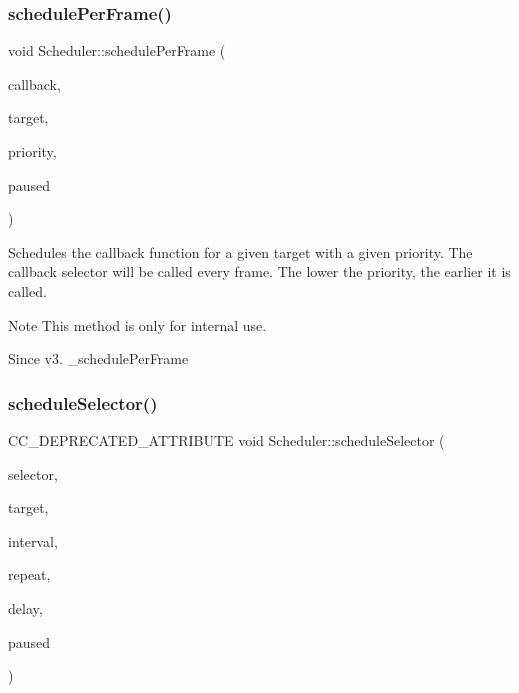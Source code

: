 \subsubsection{\texorpdfstring{schedule\+Per\+Frame()}{schedulePerFrame()}\hspace{0.1cm}{\footnotesize\ttfamily [2/2]}}
{\footnotesize\ttfamily void Scheduler\+::schedule\+Per\+Frame (\begin{DoxyParamCaption}\item[{const cc\+Scheduler\+Func \&}]{callback,  }\item[{void $\ast$}]{target,  }\item[{int}]{priority,  }\item[{bool}]{paused }\end{DoxyParamCaption})\hspace{0.3cm}{\ttfamily [protected]}}

Schedules the \textquotesingle{}callback\textquotesingle{} function for a given target with a given priority. The \textquotesingle{}callback\textquotesingle{} selector will be called every frame. The lower the priority, the earlier it is called. \begin{DoxyNote}{Note}
This method is only for internal use. 
\end{DoxyNote}
\begin{DoxySince}{Since}
v3.  \+\_\+schedule\+Per\+Frame 
\end{DoxySince}
\mbox{\label{classScheduler_ae8df7fdf2f74a90cdb37bc334a550360}} 
\subsubsection{\texorpdfstring{schedule\+Selector()}{scheduleSelector()}\hspace{0.1cm}{\footnotesize\ttfamily [1/4]}}
{\footnotesize\ttfamily C\+C\+\_\+\+D\+E\+P\+R\+E\+C\+A\+T\+E\+D\+\_\+\+A\+T\+T\+R\+I\+B\+U\+TE void Scheduler\+::schedule\+Selector (\begin{DoxyParamCaption}\item[{S\+E\+L\+\_\+\+S\+C\+H\+E\+D\+U\+LE}]{selector,  }\item[{\hyperlink{classRef}{Ref} $\ast$}]{target,  }\item[{float}]{interval,  }\item[{unsigned int}]{repeat,  }\item[{float}]{delay,  }\item[{bool}]{paused }\end{DoxyParamCaption})\hspace{0.3cm}{\ttfamily [inline]}}

